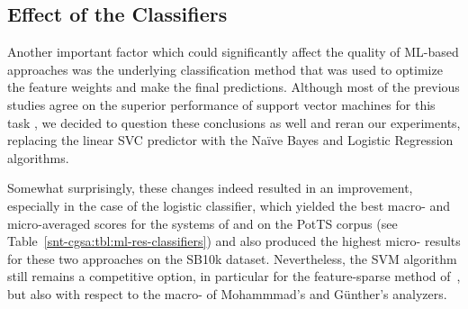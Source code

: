 \subsection{Effect of the Classifiers}\label{subsec:cgsa:ml-methods:classifiers-analysis}

Another important factor which could significantly affect the quality
of ML-based approaches was the underlying classification method that
was used to optimize the feature weights and make the final
predictions.  Although most of the previous studies agree on the
superior performance of support vector machines for this task
\cite[see ][]{Pang:02,Gamon:04,Mohammad:13}, we decided to question
these conclusions as well and reran our experiments, replacing the
linear SVC predictor with the Na\"ive Bayes and Logistic Regression
algorithms.

Somewhat surprisingly, these changes indeed resulted in an
improvement, especially in the case of the logistic classifier, which
yielded the best macro- and micro-averaged scores for the systems of
\citet{Mohammad:13} and \citet{Guenther:14} on the PotTS corpus (see
Table~\ref{snt-cgsa:tbl:ml-res-classifiers}) and also produced the
highest micro-\F{} results for these two approaches on the SB10k
dataset.  Nevertheless, the SVM algorithm still remains a competitive
option, in particular for the feature-sparse method
of~\citet{Gamon:04}, but also with respect to the macro-\F{} of
Mohammmad's and G\"unther's analyzers.

